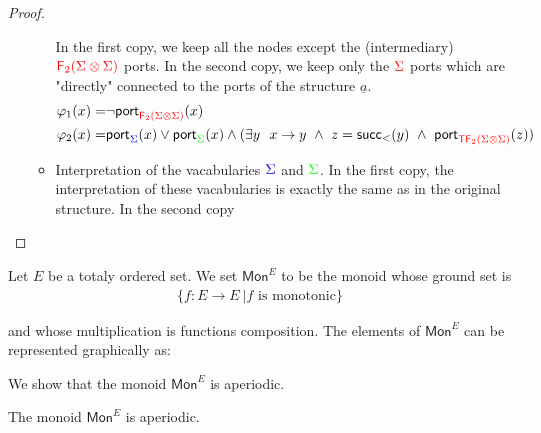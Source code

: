 \begin{proof}
\begin{enumerate}
\begin{itemize}
In the first copy, we keep all the nodes except the (intermediary) ${\color{red}{{\color{red}{\mathsf F_{2}}}({\color{red}{\Sigma}}\otimes {\color{red}{\Sigma}})}}$ ports. In the second copy, we keep only the ${\color{red}{\Sigma}}$ ports which are "directly" connected to the ports of the structure $\underline{a}$.    
\begin{align*}
\varphi_1(x)=& \neg \mathsf{port}_{\ranked {\reduce 2 (\rSigma \otimes \rSigma)}}(x) \\
\varphi_2(x)= &\mathsf{port}_{\color{blue}{\Sigma}}(x) \vee \mathsf{port}_{\color{green}{\Sigma}}(x) \wedge ( \exists y\  \ x \rightarrow y\ \wedge\ z=\mathsf{succ_<}(y)\ \wedge\ \mathsf{port}_{\ranked{\tmonad \reduce 2 (\Sigma \otimes \Sigma)}}(z) )
\end{align*}
\item Interpretation of the vacabularies $\color{blue}{\Sigma}$ and $\color{green}{\Sigma}$. In the first copy, the interpretation of these vacabularies is exactly the same as in the original structure. In the second copy 
\end{itemize} 
\end{enumerate}
    
       \end{proof}
   Let $E$ be a totaly ordered set. We set $\mathsf{Mon}^E$ to be the monoid whose ground set is 
   \begin{align*}
   \{f:E\to E \ | f \text{ is monotonic}\}
\end{align*}    

and whose multiplication is functions composition.  The elements of $\mathsf{Mon}^E$ can be represented graphically as:
     

We show that the monoid $\mathsf{Mon}^E$ is aperiodic.
     \begin{proposition}\label{prop:MonIsFo}
The monoid $\mathsf{Mon}^E$ is aperiodic.     
     \end{proposition}
     
